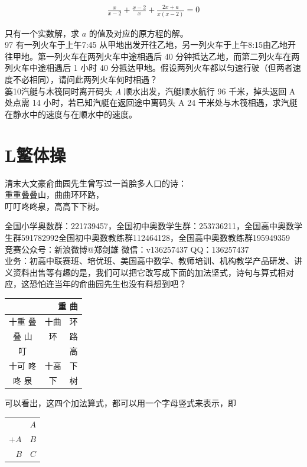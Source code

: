 \documentclass[10pt]{article}
\begin{document}
\begin{align*}
\frac{x}{x-2}+\frac{x-2}{x}+\frac{2 x+a}{x(x-2)}=0
\end{align*}

只有一个实数解，求 $a$ 的值及对应的原方程的解。\\
97 有一列火车于上午7:45 从甲地出发开往乙地，另一列火车于上午8:15由乙地开往甲地。第一列火车在两列火车中途相遇后 40 分钟抵达乙地，而第二列火车在两列火车中途相遇后 1 小时 40 分抵达甲地。假设两列火车都以匀速行驶（但两者速度不必相同），请问此两列火车何时相遇？\\
篓10汽艇与木筏同时离开码头 $A$ 顺水出发，汽艇顺水航行 96 千米，掉头返回 A处点需 14 小时，若已知汽艇在返回途中离码头 A 24 干米处与木筏相遇，求汽艇在静水中的速度与在顺水中的速度。

\section*{L鳘体操}
清末大文豪俞曲园先生曾写过一首脍多人口的诗：\\
重重叠叠山，曲曲环环路，\\
叮叮咚咚泉，高高下下树。

全国小学奥数群：221739457，全国初中奥数学生群：253736211，全国高中奥数学生群591782992全国初中奥数教练群112464128，全国高中奥数教练群195949359\\
竞赛公众号：新浪微博@郑剑雄 微信：v136257437 QQ：136257437\\
业务：初高中联赛班、培优班、美国高中数学、教师培训、机构教学产品研发、讲义资料出售等有趣的是，我们可以把它改写成下面的加法坚式，诗句与算式相对应，这恐怕连当年的俞曲园先生也没有料想到吧？

\begin{center}
\begin{tabular}{|c|c|c|}
\hline
\multicolumn{3}{|r|}{重 曲} \\
\hline
十重 叠 & 十曲 & 环 \\
\hline
叠 山 & 环 & 路 \\
\hline
叮 &  & 高 \\
\hline
十可 咚 & 十高 & 下 \\
\hline
咚 泉 & 下 & 树 \\
\hline
\end{tabular}
\end{center}

可以看出，这四个加法算式，都可以用一个字母竖式来表示，即

\begin{center}
\begin{tabular}{r}
$A$ \\
$+A \quad B$ \\
\hline
$B \quad C$ \\
\hline
\end{tabular}
\end{center}
\end{document}
